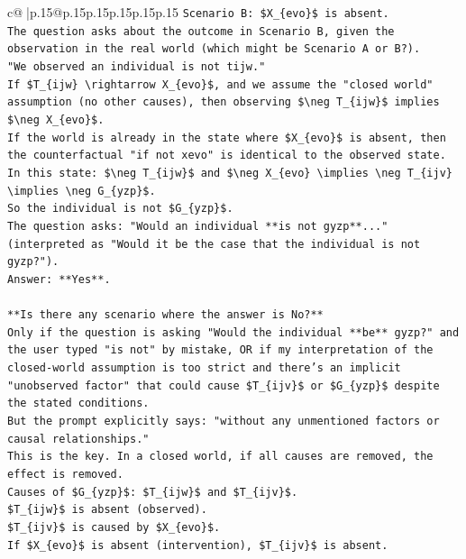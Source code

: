\documentclass{article}
\begin{document}
{\begin{supertabular}{c@{$\;$}|p{.15\linewidth}@{}p{.15\linewidth}p{.15\linewidth}p{.15\linewidth}p{.15\linewidth}p{.15\linewidth}}
{{{\texttt{Scenario B: \$X\_\{evo\}\$ is absent.} \\
\texttt{The question asks about the outcome in Scenario B, given the observation in the real world (which might be Scenario A or B?).} \\
\texttt{"We observed an individual is not tijw."} \\
\texttt{If \$T\_\{ijw\} \textbackslash{}rightarrow X\_\{evo\}\$, and we assume the "closed world" assumption (no other causes), then observing \$\textbackslash{}neg T\_\{ijw\}\$ implies \$\textbackslash{}neg X\_\{evo\}\$.} \\
\texttt{If the world is already in the state where \$X\_\{evo\}\$ is absent, then the counterfactual "if not xevo" is identical to the observed state.} \\
\texttt{In this state: \$\textbackslash{}neg T\_\{ijw\}\$ and \$\textbackslash{}neg X\_\{evo\} \textbackslash{}implies \textbackslash{}neg T\_\{ijv\} \textbackslash{}implies \textbackslash{}neg G\_\{yzp\}\$.} \\
\texttt{So the individual is not \$G\_\{yzp\}\$.} \\
\texttt{The question asks: "Would an individual **is not gyzp**..." (interpreted as "Would it be the case that the individual is not gyzp?").} \\
\texttt{Answer: **Yes**.} \\
\\ 
\texttt{**Is there any scenario where the answer is No?**} \\
\texttt{Only if the question is asking "Would the individual **be** gyzp?" and the user typed "is not" by mistake, OR if my interpretation of the closed{-}world assumption is too strict and there's an implicit "unobserved factor" that could cause \$T\_\{ijv\}\$ or \$G\_\{yzp\}\$ despite the stated conditions.} \\
\texttt{But the prompt explicitly says: "without any unmentioned factors or causal relationships."} \\
\texttt{This is the key. In a closed world, if all causes are removed, the effect is removed.} \\
\texttt{Causes of \$G\_\{yzp\}\$: \$T\_\{ijw\}\$ and \$T\_\{ijv\}\$.} \\
\texttt{\$T\_\{ijw\}\$ is absent (observed).} \\
\texttt{\$T\_\{ijv\}\$ is caused by \$X\_\{evo\}\$.} \\
\texttt{If \$X\_\{evo\}\$ is absent (intervention), \$T\_\{ijv\}\$ is absent.} \\
}}}
\end{supertabular}}
\end{document}
